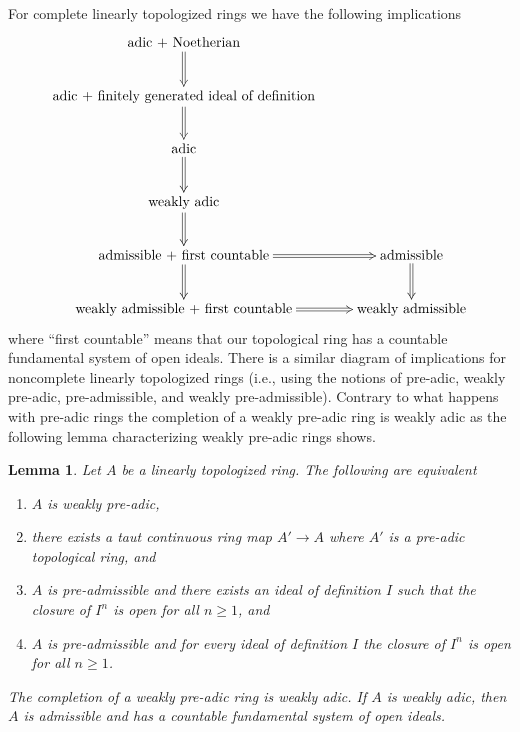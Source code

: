 \documentclass{stacks-project}
\theoremstyle{plain}
\newtheorem{lemma}[subsection]{Lemma}
\theoremstyle{definition}
\theoremstyle{remark}
\numberwithin{equation}{subsection}
\begin{document}
\noindent
For complete linearly topologized rings we have the following implications
$$
\xymatrix{
\text{adic + Noetherian} \ar@{=>}[d] \\
\text{adic + finitely generated ideal of definition} \ar@{=>}[d] \\
\text{adic} \ar@{=>}[d] \\
\text{weakly adic} \ar@{=>}[d] \\
\text{admissible + first countable} \ar@{=>}[d] \ar@{=>}[r] &
\text{admissible} \ar@{=>}[d] \\
\text{weakly admissible + first countable} \ar@{=>}[r] &
\text{weakly admissible}
}
$$
where ``first countable'' means that our topological ring has a countable
fundamental system of open ideals. There is a similar diagram of implications
for noncomplete linearly topologized rings (i.e., using the notions
of pre-adic, weakly pre-adic, pre-admissible, and weakly pre-admissible).
Contrary to what happens with pre-adic rings the completion of a
weakly pre-adic ring is weakly adic as the following lemma
characterizing weakly pre-adic rings shows.

\begin{lemma}
\label{lemma-weakly-adic}
Let $A$ be a linearly topologized ring. The following are equivalent
\begin{enumerate}
\item $A$ is weakly pre-adic,
\item there exists a taut continuous ring map $A' \to A$
where $A'$ is a pre-adic topological ring, and
\item $A$ is pre-admissible and there exists an ideal of definition $I$
such that the closure of $I^n$ is open for all $n \geq 1$, and
\item $A$ is pre-admissible and for every ideal of definition $I$
the closure of $I^n$ is open for all $n \geq 1$.
\end{enumerate}
The completion of a weakly pre-adic ring is weakly adic.
If $A$ is weakly adic, then $A$ is admissible and has a countable
fundamental system of open ideals.
\end{lemma}
\end{document}
